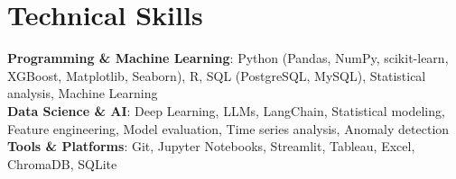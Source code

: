\documentclass[letterpaper,11pt]{article}
\begin{document}
\section{Technical Skills}
 \begin{itemize}[leftmargin=0.15in, label={}]
    \small{\item{
     \textbf{Programming \& Machine Learning}{: Python (Pandas, NumPy, scikit-learn, XGBoost, Matplotlib, Seaborn), R, SQL (PostgreSQL, MySQL), Statistical analysis, Machine Learning} \\
     \textbf{Data Science \& AI}{: Deep Learning, LLMs, LangChain, Statistical modeling, Feature engineering, Model evaluation, Time series analysis, Anomaly detection} \\
     \textbf{Tools \& Platforms}{: Git, Jupyter Notebooks, Streamlit, Tableau, Excel, ChromaDB, SQLite}
    }}
 \end{itemize}

\end{document}
